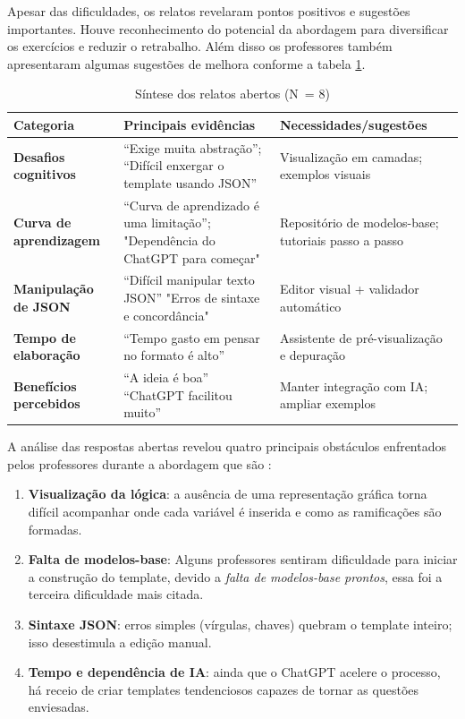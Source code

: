 Apesar das dificuldades, os relatos revelaram pontos positivos e sugestões importantes. Houve reconhecimento do potencial da abordagem para diversificar os exercícios e reduzir o retrabalho. Além disso os professores também apresentaram algumas sugestões de melhora conforme a tabela \ref{tab:relatos-abertos}.


\begin{table}[H]
\centering
\caption{Síntese dos relatos abertos (N~= 8)}
\label{tab:relatos-abertos}
\begin{tabular}{|p{} |p{} |p{}|}
\hline
\textbf{Categoria} & \textbf{Principais evidências} & \textbf{Necessidades/sugestões} \\ \hline
\textbf{Desafios cognitivos} & 
    “Exige muita abstração”; \newline
    “Difícil enxergar o template usando JSON”
& Visualização em camadas; exemplos visuais \\ \hline
\textbf{Curva de aprendizagem} & 
    “Curva de aprendizado é uma limitação”;\newline
     "Dependência do ChatGPT para começar"
 & Repositório de modelos-base; tutoriais passo a passo \\ \hline
\textbf{Manipulação de JSON} & 
    “Difícil manipular texto JSON” \newline
    "Erros de sintaxe e concordância"
 & Editor visual + validador automático \\ \hline
\textbf{Tempo de elaboração} & 
    “Tempo gasto em pensar no formato é alto” 
& Assistente de pré-visualização e depuração \\ \hline
\textbf{Benefícios percebidos} & 
    “A ideia é boa” \newline
    “ChatGPT facilitou muito”
 & Manter integração com IA; ampliar exemplos \\ \hline
\end{tabular}
\end{table}

A análise das respostas abertas revelou quatro principais obstáculos enfrentados pelos professores durante a abordagem que são : 

\begin{enumerate}
    \item \textbf{Visualização da lógica}: a ausência de uma representação gráfica torna difícil acompanhar onde cada variável é inserida e como as ramificações são formadas.
    \item \textbf{Falta de modelos-base}: Alguns professores sentiram dificuldade para iniciar a construção do template, devido a \emph{falta de modelos-base prontos}, essa foi a terceira dificuldade mais citada.
    \item \textbf{Sintaxe JSON}: erros simples (vírgulas, chaves) quebram o template inteiro; isso desestimula a edição manual.
    \item \textbf{Tempo e dependência de IA}: ainda que o ChatGPT acelere o processo, há receio de criar templates tendenciosos capazes de tornar as questões enviesadas.
\end{enumerate}

